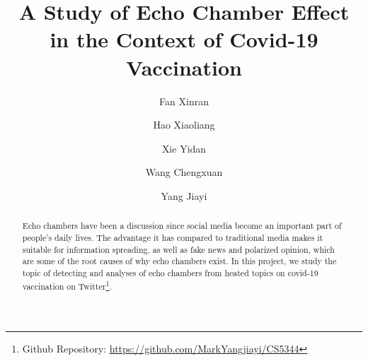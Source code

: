 \documentclass[sigplan,screen]{acmart}
\begin{document}
\title{A Study of Echo Chamber Effect in the Context of Covid-19 Vaccination}

\author{Fan Xinran}

\author{Hao Xiaoliang}

\author{Xie Yidan}

\author{Wang Chengxuan}

\author{Yang Jiayi}


\begin{abstract}
Echo chambers have been a discussion since social media become an important part of people’s daily lives. The advantage it has compared to traditional media makes it suitable for information spreading, as well as fake news and polarized opinion, which are some of the root causes of why echo chambers exist. In this project, we study the topic of detecting and analyses of echo chambers from heated topics on covid-19 vaccination on Twitter\footnote{Github Repository: \url{https://github.com/MarkYangjiayi/CS5344}}.
\end{abstract}
\end{document}
